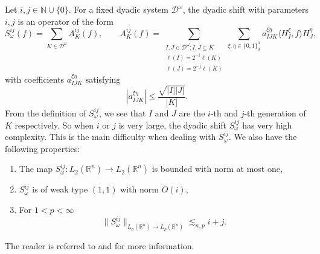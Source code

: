 \documentclass[oneside,english,a4wide]{amsart}
\numberwithin{equation}{section}
\numberwithin{figure}{section}
\theoremstyle{plain}
\theoremstyle{plain}
\theoremstyle{definition}
\theoremstyle{plain}
\theoremstyle{remark}
\theoremstyle{definition}
\theoremstyle{remark}
\theoremstyle{definition}
\newcommand{\8}{\infty}
\begin{document}
Let $i,j\in \mathbb{N}\cup\{0\}$. For a fixed dyadic system $\mathcal{D}^\omega$, the dyadic shift with parameters $i,j$ is an operator of the form
\[S_\omega^{ij}(f)=\sum_{K\in\mathcal{D}^\omega}A_K^{ij}(f),\quad\quad A_K^{ij}(f)=\sum_{\substack{I,J\in\mathcal{D}^\omega;I,J\subseteq K\\ \ell(I)=2^{-i}\ell(K)\\\ell(J)=2^{-j}\ell(K)}}\sum_{\xi,\eta\in\{0,1\}^n_0}a_{IJK}^{\xi\eta}\langle H_I^\xi,f\rangle H_J^\eta,\]
with coefficients $a_{IJK}^{\xi\eta}$ satisfying
\begin{equation}\label{aijkxieta}
	|a_{IJK}^{\xi\eta}|\le\frac{\sqrt{|I||J|}}{|K|}.
\end{equation}
From the definition of $S_\omega^{ij}$, we see that $I$ and $J$ are the $i$-th and $j$-th generation of $K$ respectively. So when $i$ or $j$ is very large, the dyadic shift $S_\omega^{ij}$ has very high complexity. This is the main difficulty when dealing with $S_\omega^{ij}$. We  also have the following properties:
\begin{enumerate}
	\item The map $S_\omega^{ij}:L_2(\mathbb{R}^n)\to L_2(\mathbb{R}^n)$  is bounded with norm at most one,
	\item $S_\omega^{ij}$ is of weak type $(1,1)$ with norm $O(i)$,
	\item For $1<p<\8$
	$$ \|S_\omega^{ij}\|_{L_p(\mathbb{R}^n)\rightarrow L_p(\mathbb{R}^n)}\lesssim_{n, p} i+j.   $$
\end{enumerate} 
The reader is referred to \cite{TH1} and \cite{TH2} for more information.
\end{document}

